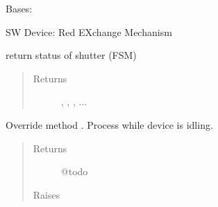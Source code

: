 \documentclass[letterpaper,10pt,english]{sphinxmanual}
\begin{document}
\begin{fulllineitems}
\label{enuActor.Devices:enuActor.Devices.rexm.Rexm}
Bases: {\hyperref[enuActor.Devices:enuActor.Devices.Device.Device]{}}

SW Device: Red EXchange Mechanism

\begin{fulllineitems}
\label{enuActor.Devices:enuActor.Devices.rexm.Rexm.check_status}
\end{fulllineitems}


\begin{fulllineitems}
\label{enuActor.Devices:enuActor.Devices.rexm.Rexm.getStatus}
return status of shutter (FSM)
\begin{quote}\begin{description}
\item[{Returns}] \leavevmode
{}, , , ...

\end{description}\end{quote}

\end{fulllineitems}


\begin{fulllineitems}
\label{enuActor.Devices:enuActor.Devices.rexm.Rexm.handleTimeout}
Override method {\hyperref[enuActor:enuActor.QThread.QThread.handleTimeout]{}}.
Process while device is idling.
\begin{quote}\begin{description}
\item[{Returns}] \leavevmode
@todo

\item[{Raises}] \leavevmode
{\hyperref[enuActor.Devices:enuActor.Devices.Error.CommErr]{}}

\end{description}\end{quote}


\end{fulllineitems}
\end{fulllineitems}
\end{document}
